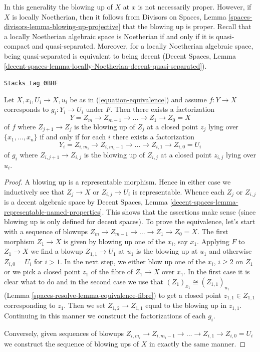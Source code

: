 In this generality the blowing up of $X$ at $x$ is not necessarily proper.
However, if $X$ is locally Noetherian, then it follows from
Divisors on Spaces, Lemma \ref{spaces-divisors-lemma-blowing-up-projective}
that the blowing up is proper.
Recall that a locally Noetherian algebraic space is Noetherian if
and only if it is quasi-compact and quasi-separated. Moreover, for
a locally Noetherian algebraic space, being quasi-separated is
equivalent to being decent (Decent Spaces, Lemma
\ref{decent-spaces-lemma-locally-Noetherian-decent-quasi-separated}).

\begin{lemma}
\label{spaces-resolve-lemma-equivalence-sequence-blowups}
\href{https://stacks.math.columbia.edu/tag/0BHF}{\texttt{Stacks tag 0BHF}}

Let $X, x_i, U_i \to X, u_i$ be as in (\ref{equation-equivalence})
and assume $f : Y \to X$ corresponds to $g_i : Y_i \to U_i$ under $F$.
Then there exists a factorization
$$
Y = Z_m \to Z_{m - 1} \to \ldots \to Z_1 \to Z_0 = X
$$
of $f$ where $Z_{j + 1} \to Z_j$ is the blowing up of $Z_j$ at a closed
point $z_j$ lying over $\{x_1, \ldots, x_n\}$ if and only if for each
$i$ there exists a factorization
$$
Y_i = Z_{i, m_i} \to Z_{i, m_i - 1} \to \ldots \to Z_{i, 1} \to Z_{i, 0} = U_i
$$
of $g_i$ where $Z_{i, j + 1} \to Z_{i, j}$ is the blowing up of $Z_{i, j}$
at a closed point $z_{i, j}$ lying over $u_i$.
\end{lemma}

\begin{proof}
A blowing up is a representable morphism. Hence in either case
we inductively see that $Z_j \to X$ or $Z_{i, j} \to U_i$ is
representable. Whence each $Z_j$ or $Z_{i, j}$ is a decent
algebraic space by Decent Spaces, Lemma
\ref{decent-spaces-lemma-representable-named-properties}.
This shows that the assertions make sense (since blowing up
is only defined for decent spaces).
To prove the equivalence, let's start with a sequence of blowups
$Z_m \to Z_{m - 1} \to \ldots \to Z_1 \to Z_0 = X$.
The first morphism $Z_1 \to X$ is given
by blowing up one of the $x_i$, say $x_1$. Applying $F$
to $Z_1 \to X$ we find a blowup $Z_{1, 1} \to U_1$ at $u_1$
is the blowing up at $u_1$ and otherwise $Z_{i, 0} = U_i$ for $i > 1$.
In the next step, we either blow up one of the $x_i$, $i \geq 2$
on $Z_1$ or we pick a closed point $z_1$ of the fibre of $Z_1 \to X$
over $x_1$. In the first case it is clear what to do and in
the second case we use that $(Z_1)_{x_1} \cong (Z_{1, 1})_{u_1}$
(Lemma \ref{spaces-resolve-lemma-equivalence-fibre})
to get a closed point $z_{1, 1} \in Z_{1, 1}$ corresponding to $z_1$.
Then we set $Z_{1, 2} \to Z_{1, 1}$ equal to the blowing up
in $z_{1, 1}$. Continuing in this manner we construct the factorizations
of each $g_i$.

\medskip\noindent
Conversely, given sequences of blowups
$Z_{i, m_i} \to Z_{i, m_i - 1} \to \ldots \to Z_{i, 1} \to Z_{i, 0} = U_i$
we construct the sequence of blowing ups of $X$ in exactly the same manner.
\end{proof}

